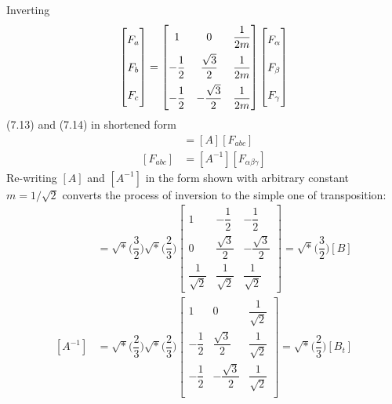 \documentclass[a4paper,numbers=noenddot,12pt]{scrbook}
\begin{document}
        Inverting
        \begin{equation}
            \begin{bmatrix}
                F_a \vphantom{\dfrac{1}{2}} \\[2ex]
                F_b \vphantom{\dfrac{1}{2}} \\[2ex]
                F_c \vphantom{\dfrac{1}{2}} \\
            \end{bmatrix}
            =
            \begin{bmatrix}
                1  & 0 & \dfrac{1}{2m} \\[2ex]
                - \dfrac{1}{2} & \dfrac{\sqrt{3}}{2} & \dfrac{1}{2m} \\[2ex]
                - \dfrac{1}{2} & - \dfrac{\sqrt{3}}{2} & \dfrac{1}{2m}
            \end{bmatrix}
            \begin{bmatrix}
                F_{\alpha} \vphantom{\dfrac{1}{2}} \\[2ex]
                F_{\beta} \vphantom{\dfrac{1}{2}} \\[2ex]
                F_{\gamma} \vphantom{\dfrac{1}{2}} 
            \end{bmatrix}
            \label{eq:Eq7.14}
        \end{equation}
        (7.13) and (7.14) in shortened form
        \begin{align}
            [F_{\alpha \beta \gamma}] & =  [A][F_{abc}]\\
            [F_{abc}] & = [A^{-1}] [F_{\alpha \beta \gamma}]
            \label{eq:Eq7.16}
        \end{align}
        Re-writing $[A]$ and $[A^{-1}]$ in the form shown with arbitrary constant $m = 1/ \sqrt{2}$ converts the process of inversion to the simple one of transposition:
        \begin{align}
            [A] & = \sqrt*{\Big(\dfrac{3}{2}\Big)} \sqrt*{\Big(\dfrac{2}{3}\Big)}
            \begin{bmatrix}
                1  & - \dfrac{1}{2} & - \dfrac{1}{2} \\[2ex]
                0 & \dfrac{\sqrt{3}}{2} & - \dfrac{\sqrt{3}}{2} \\[2ex]
                \dfrac{1}{\sqrt{2}} & \dfrac{1}{\sqrt{2}} & \dfrac{1}{\sqrt{2}}
            \end{bmatrix}
            =
            \sqrt*{\Big(\dfrac{3}{2}\Big)}[B] \\
            [A^{-1}] & = \sqrt*{\Big(\dfrac{2}{3}\Big)} \sqrt*{\Big(\dfrac{2}{3}\Big)}
            \begin{bmatrix}
                1 & 0 & \dfrac{1}{\sqrt{2}} \\[2ex]
                - \dfrac{1}{2} & \dfrac{\sqrt{3}}{2} & \dfrac{1}{\sqrt{2}} \\[2ex]
                - \dfrac{1}{2} & - \dfrac{\sqrt{3}}{2} & \dfrac{1}{\sqrt{2}}\\
            \end{bmatrix}
            =
            \sqrt*{\Big(\dfrac{2}{3}\Big)}[B_t] 
            \label{eq:Eq7.18}
        \end{align}
\end{document}
